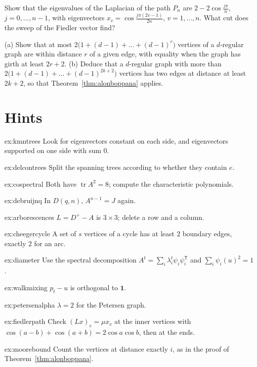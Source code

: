\begin{exercise}[$\star\star$]\label{ex:fiedlerpath}
Show that the eigenvalues of the Laplacian of the path $P_n$ are $2-2\cos\frac{j\pi}n$, $j=0,\dots,n-1$, with eigenvectors $x_v=\cos\frac{j\pi(2v-1)}{2n}$, $v=1,\dots,n$. What cut does the sweep of
the Fiedler vector find?
\end{exercise}

\begin{exercise}[$\star$]\label{ex:moorebound}
(a) Show that at most $2\bigl(1+(d-1)+\dots+(d-1)^r\bigr)$ vertices of a $d$-regular graph are within distance $r$ of a given edge, with equality when the graph has girth at least $2r+2$.
(b) Deduce that a $d$-regular graph with more than $2\bigl(1+(d-1)+\dots+(d-1)^{2k+2}\bigr)$ vertices has two edges at distance at least $2k+2$, so that Theorem~\ref{thm:alonboppana} applies.
\end{exercise}

\section{Hints}

\begin{hint}{ex:kmntrees}
Look for eigenvectors constant on each side, and eigenvectors supported on one side with sum $0$.
\end{hint}
\begin{hint}{ex:delcontrees}
Split the spanning trees according to whether they contain $e$.
\end{hint}
\begin{hint}{ex:cospectral}
Both have $\operatorname{tr}A^2=8$; compute the characteristic polynomials.
\end{hint}
\begin{hint}{ex:debruijnq}
In $D(q,n)$, $A^{n-1}=J$ again.
\end{hint}
\begin{hint}{ex:arborescences}
$L=D^+-A$ is $3\times3$; delete a row and a column.
\end{hint}
\begin{hint}{ex:cheegercycle}
A set of $s$ vertices of a cycle has at least $2$ boundary edges, exactly $2$ for an arc.
\end{hint}
\begin{hint}{ex:diameter}
Use the spectral decomposition $A^t=\sum_i\lambda_i^t\psi_i\psi_i^{\mathsf T}$ and $\sum_i\psi_i(u)^2=1$.
\end{hint}
\begin{hint}{ex:walkmixing}
$p_t-u$ is orthogonal to $\mathbf1$.
\end{hint}
\begin{hint}{ex:petersenalpha}
$\lambda=2$ for the Petersen graph.
\end{hint}
\begin{hint}{ex:fiedlerpath}
Check $(Lx)_v=\mu x_v$ at the inner vertices with $\cos(a-b)+\cos(a+b)=2\cos a\cos b$, then at the ends.
\end{hint}
\begin{hint}{ex:moorebound}
Count the vertices at distance exactly $i$, as in the proof of Theorem~\ref{thm:alonboppana}.
\end{hint}

